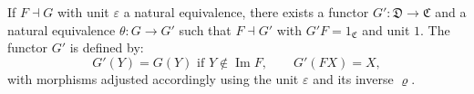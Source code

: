 If $F \dashv G$ with unit $\varepsilon$ a natural equivalence, there exists a functor $G' : \mathfrak{D} \to \mathfrak{C}$ and a natural equivalence $\theta : G \to G'$ such that $F \dashv G'$ with $G'F = 1_{\mathfrak{C}}$ and unit $1$. The functor $G'$ is defined by:
$$
G'(Y) = G(Y) \text{ if } Y \notin \operatorname{Im} F, \qquad G'(FX) = X,
$$
with morphisms adjusted accordingly using the unit $\varepsilon$ and its inverse $\varrho$.
